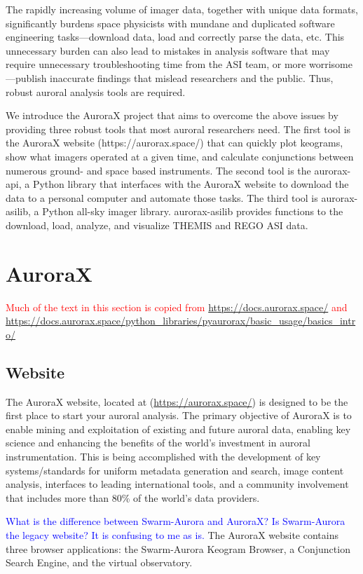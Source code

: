 \documentclass[draft]{agujournal2019}
\begin{document}
The rapidly increasing volume of imager data, together with unique data formats, significantly burdens space physicists with mundane and duplicated software engineering tasks---download data, load and correctly parse the data, etc. This unnecessary burden can also lead to mistakes in analysis software that may require unnecessary troubleshooting time from the ASI team, or more worrisome---publish inaccurate findings that mislead researchers and the public. Thus, robust auroral analysis tools are required.

We introduce the AuroraX project that aims to overcome the above issues by providing three robust tools that most auroral researchers need. The first tool is the AuroraX website (https://aurorax.space/) that can quickly plot keograms, show what imagers operated at a given time, and calculate conjunctions between numerous ground- and space based instruments. The second tool is the aurorax-api, a Python library that interfaces with the AuroraX website to download the data to a personal computer and automate those tasks. The third tool is aurorax-asilib, a Python all-sky imager library. aurorax-asilib provides functions to the download, load, analyze, and visualize THEMIS and REGO ASI data. 

\section{AuroraX}\label{aurorax}
\textcolor{red}{Much of the text in this section is copied from \url{https://docs.aurorax.space/} and \url{https://docs.aurorax.space/python_libraries/pyaurorax/basic_usage/basics_intro/}}

\subsection{Website}
The AuroraX website, located at (\url{https://aurorax.space/}) is designed to be the first place to start your auroral analysis. The primary objective of AuroraX is to enable mining and exploitation of existing and future auroral data, enabling key science and enhancing the benefits of the world's investment in auroral instrumentation. This is being accomplished with the development of key systems/standards for uniform metadata generation and search, image content analysis, interfaces to leading international tools, and a community involvement that includes more than 80\% of the world's data providers.

\textcolor{blue}{What is the difference between Swarm-Aurora and AuroraX? Is Swarm-Aurora the legacy website? It is confusing to me as is.} The AuroraX website contains three browser applications: the Swarm-Aurora Keogram Browser, a Conjunction Search Engine, and the virtual observatory. 
\end{document}
